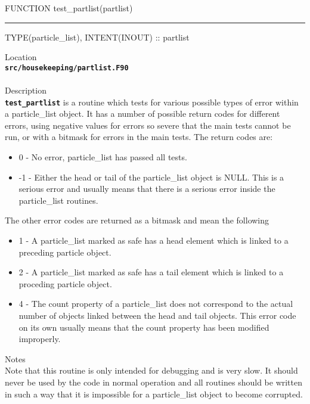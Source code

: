 \documentclass[12pt,a4paper]{article}
\newcommand{\HRule}{\rule[0.3cm]{\linewidth}{0.5mm}}
\newcommand{\inlinecode}[1]{{\color{warwickred} \bf\texttt{#1}}}
\begin{document}
\pagebreak
\begin{codedef}
FUNCTION test_partlist(partlist)
\HRule
TYPE(particle_list), INTENT(INOUT) :: partlist
\end{codedef}
\vspace{1cm}
{\Large Location\\}
\inlinecode{src/housekeeping/partlist.F90}\\
\\[0.5cm]
{\Large Description\\}
\inlinecode{test\_partlist} is a routine which tests for various possible types
of error within a particle\_list object. It has a number of possible return
codes for different errors, using negative values for errors so severe that
the main tests cannot be run, or with a bitmask for errors in the main tests.
The return codes are:
\begin{itemize}
\item 0 - No error, particle\_list has passed all tests.
\item -1 - Either the head or tail of the particle\_list object is NULL. This is
  a serious error and usually means that there is a serious error inside the
  particle\_list routines.
\end{itemize}
The other error codes are returned as a bitmask and mean the following
\begin{itemize}
\item 1 - A particle\_list marked as safe has a head element which is linked to
  a preceding particle object.
\item 2 - A particle\_list marked as safe has a tail element which is linked to
  a proceding particle object.
\item 4 - The count property of a particle\_list does not correspond to the
  actual number of objects linked between the head and tail objects. This error
  code on its own usually means that the count property has been modified
  improperly.
\end{itemize}
\vspace{0.5cm}
{\Large Notes\\}
Note that this routine is only intended for debugging and is very slow. It
should never be used by the code in normal operation and all routines should be
written in such a way that it is impossible for a particle\_list object to
become corrupted.
\end{document}
